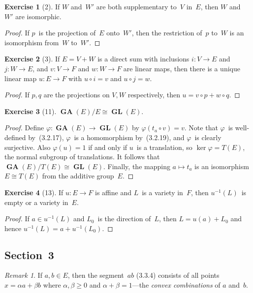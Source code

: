 \documentclass[letterpaper,12pt]{article}
\newcommand{\iso}{\cong}
\newcommand{\after}{\circ}
\DeclareMathOperator{\GL}{\mathbf{GL}}
\DeclareMathOperator{\GA}{\mathbf{GA}}
\newcommand{\inv}[1]{#1^{-1}}
\theoremstyle{definition}
\newtheorem*{exer}{Exercise}
\theoremstyle{remark}
\newtheorem*{rmk}{Remark}
\begin{document}
\begin{exer}[2]
If \(W\) and~\(W'\) are both supplementary to~\(V\) in~\(E\), then \(W\) and~\(W'\) are isomorphic.
\end{exer}
\begin{proof}
If \(p\)~is the projection of~\(E\) onto~\(W'\), then the restriction of~\(p\) to~\(W\) is an isomorphism from~\(W\) to~\(W'\).
\end{proof}

\begin{exer}[3]
If \(E=V+W\) is a direct sum with inclusions \(i:V\to E\) and \(j:W\to E\), and \(v:V\to F\) and \(w:W\to F\) are linear maps, then there is a unique linear map \(u:E\to F\) with \(u\after i=v\) and \(u\after j=w\).
\end{exer}
\begin{proof}
If \(p,q\) are the projections on \(V,W\) respectively, then \(u=v\after p+w\after q\).
\end{proof}

\begin{exer}[11]
\(\GA(E)/E\iso\GL(E)\).
\end{exer}
\begin{proof}
Define \(\varphi:\GA(E)\to\GL(E)\) by \(\varphi(t_a\after v)=v\). Note that \(\varphi\)~is well-defined by~(3.2.17), \(\varphi\)~is a homomorphism by~(3.2.19), and \(\varphi\)~is clearly surjective. Also \(\varphi(u)=1\) if and only if \(u\)~is a translation, so \(\ker\varphi=T(E)\), the normal subgroup of translations. It follows that \(\GA(E)/T(E)\iso\GL(E)\). Finally, the mapping \(a\mapsto t_a\) is an isomorphism \(E\iso T(E)\) from the additive group~\(E\).
\end{proof}

\begin{exer}[13]
If \(u:E\to F\) is affine and \(L\)~is a variety in~\(F\), then \(\inv{u}(L)\)~is empty or a variety in~\(E\).
\end{exer}
\begin{proof}
If \(a\in\inv{u}(L)\) and \(L_0\)~is the direction of~\(L\), then \(L=u(a)+L_0\) and hence \(\inv{u}(L)=a+\inv{u}(L_0)\).
\end{proof}

\subsection*{Section~3}
\begin{rmk}
If \(a,b\in E\), then the segment~\(ab\) (3.3.4) consists of all points \(x=\alpha a+\beta b\) where \(\alpha,\beta\ge 0\) and \(\alpha+\beta=1\)---the \emph{convex combinations} of \(a\) and~\(b\).
\end{rmk}
\end{document}
